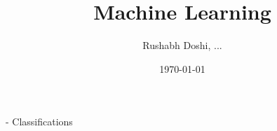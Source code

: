 \documentclass[10pt,technote]{IEEEtran}
\title{Machine Learning}
\author{Rushabh Doshi, ...}
\date{\today}
\begin{document}
\maketitle
- Classifications
\end{document}
